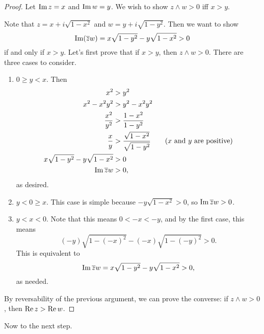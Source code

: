 \begin{proof}
    Let $\operatorname{Im} z = x$ and $\operatorname{Im} w = y$.
    We wish to show $z \wedge w > 0$ iff $x > y$.
    
    Note that $z = x + i\sqrt{1 - x^2}$ and 
    $w = y + i\sqrt{1 - y^2}$.
    Then we want to show
    \[ \operatorname{Im}(\overline{z}w) = x\sqrt{1 - y^2} - y\sqrt{1 - x^2}
    > 0 \]
    if and only if $x > y$.
    Let's first prove that if $x > y$, then $z \wedge w > 0$.
    There are three cases to consider.

    \begin{enumerate}
        \item $0 \ge y < x$.
            Then
            \begin{align*}
                x^2 &> y^2 \\
                x^2 - x^2y^2 &> y^2 - x^2y^2 \\
                \frac{x^2}{y^2} &> \frac{1 - x^2}{1 - y^2} \\
                \frac{x}{y} &> \frac{\sqrt{1 - x^2}}{\sqrt{1- y^2}} \tag{$x$ and $y$ are positive} \\
                x\sqrt{1-y^2} - y\sqrt{1-x^2} &> 0 \\
                \operatorname{Im}{\overline{z}w} &> 0,
            \end{align*}
            as desired.

        \item $y < 0 \ge x$.
            This case is simple because $-y\sqrt{1-x^2} > 0$, 
            so $\operatorname{Im}{\overline{z}w} > 0$.

        \item $y < x < 0$.
            Note that this means $0 < -x < -y$, and by
            the first case, this means 
            \[ (-y)\sqrt{1 - (-x)^2} - (-x)\sqrt{1 - (-y)^2}
            > 0. \]
            This is equivalent to 
            \[ \operatorname{Im}{\overline{z}w} = x\sqrt{1 - y^2} - 
            y\sqrt{1 - x^2} > 0, \]
            as needed.
    \end{enumerate}

    By reversability of the previous argument, we can prove
    the converse: if $z \wedge w > 0$, then $\operatorname{Re}{z} > \operatorname{Re}{w}$.

\end{proof}

Now to the next step.


